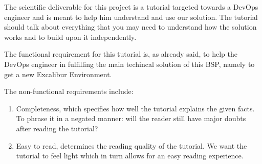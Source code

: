 
The scientific deliverable for this project is a tutorial targeted
towards a DevOps engineer and is meant to help him understand and use
our solution. The tutorial should talk about everything that you may
need to understand how the solution works and to build upon it
independently.

The functional requirement for this tutorial is, as already said, to
help the DevOps engineer in fulfilling the main techincal solution of
this BSP, namely to get a new Excalibur Environment.

The non-functional requirements include:
\begin{enumerate}
	 \item Completeness, which specifies how well the tutorial
		 explains the given facts. To phrase it in a negated manner:
		 will the reader still have major doubts after reading the
		 tutorial?
	 \item Easy to read, determines the reading quality of
		the tutorial.  We want the tutorial to feel light which in
		turn allows for an easy reading experience.
\end{enumerate}
